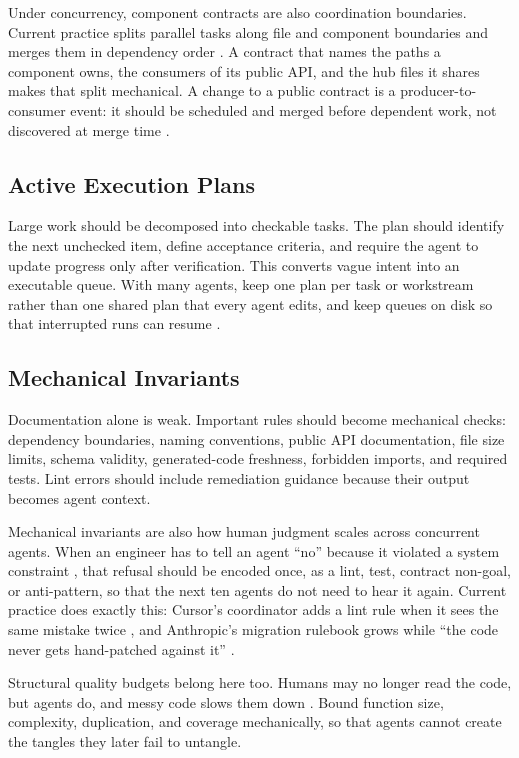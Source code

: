 \documentclass[11pt]{article}
\begin{document}
Under concurrency, component contracts are also coordination boundaries. Current practice splits parallel tasks along file and component boundaries and merges them in dependency order \cite{osmani2026cloud,anthropic2026migrations}. A contract that names the paths a component owns, the consumers of its public API, and the hub files it shares makes that split mechanical. A change to a public contract is a producer-to-consumer event: it should be scheduled and merged before dependent work, not discovered at merge time \cite{muku2026npbench}.

\subsection{Active Execution Plans}
Large work should be decomposed into checkable tasks. The plan should identify the next unchecked item, define acceptance criteria, and require the agent to update progress only after verification. This converts vague intent into an executable queue. With many agents, keep one plan per task or workstream rather than one shared plan that every agent edits, and keep queues on disk so that interrupted runs can resume \cite{anthropic2026migrations}.

\subsection{Mechanical Invariants}
Documentation alone is weak. Important rules should become mechanical checks: dependency boundaries, naming conventions, public API documentation, file size limits, schema validity, generated-code freshness, forbidden imports, and required tests. Lint errors should include remediation guidance because their output becomes agent context.

Mechanical invariants are also how human judgment scales across concurrent agents. When an engineer has to tell an agent ``no'' because it violated a system constraint \cite{anthropic2026scion}, that refusal should be encoded once, as a lint, test, contract non-goal, or anti-pattern, so that the next ten agents do not need to hear it again. Current practice does exactly this: Cursor's coordinator adds a lint rule when it sees the same mistake twice \cite{cursor2026projects}, and Anthropic's migration rulebook grows while ``the code never gets hand-patched against it'' \cite{anthropic2026migrations}.

Structural quality budgets belong here too. Humans may no longer read the code, but agents do, and messy code slows them down \cite{martin2026messy}. Bound function size, complexity, duplication, and coverage mechanically, so that agents cannot create the tangles they later fail to untangle.
\end{document}
